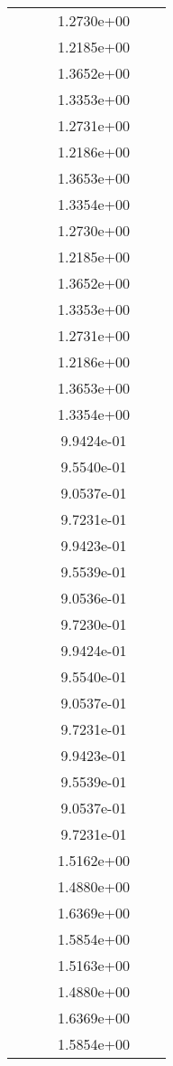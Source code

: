 \begin{xltabular}{\textwidth}{r|rS[table-format=1.3e+2]S[table-format=1.4e+2]S[table-format=1.4e+2]S[table-format=-1.5]}
&  &  & 1.2730e+00 & & \\
&  &  & 1.2185e+00 & & \\
&  &  & 1.3652e+00 & & \\
&  &  & 1.3353e+00 & & \\
&  &  & 1.2731e+00 & & \\
&  &  & 1.2186e+00 & & \\
&  &  & 1.3653e+00 & & \\
&  &  & 1.3354e+00 & & \\
&  &  & 1.2730e+00 & & \\
&  &  & 1.2185e+00 & & \\
&  &  & 1.3652e+00 & & \\
&  &  & 1.3353e+00 & & \\
&  &  & 1.2731e+00 & & \\
&  &  & 1.2186e+00 & & \\
&  &  & 1.3653e+00 & & \\
&  &  & 1.3354e+00 & & \\
&  &  & 9.9424e-01 & & \\
&  &  & 9.5540e-01 & & \\
&  &  & 9.0537e-01 & & \\
&  &  & 9.7231e-01 & & \\
&  &  & 9.9423e-01 & & \\
&  &  & 9.5539e-01 & & \\
&  &  & 9.0536e-01 & & \\
&  &  & 9.7230e-01 & & \\
&  &  & 9.9424e-01 & & \\
&  &  & 9.5540e-01 & & \\
&  &  & 9.0537e-01 & & \\
&  &  & 9.7231e-01 & & \\
&  &  & 9.9423e-01 & & \\
&  &  & 9.5539e-01 & & \\
&  &  & 9.0537e-01 & & \\
&  &  & 9.7231e-01 & & \\
&  &  & 1.5162e+00 & & \\
&  &  & 1.4880e+00 & & \\
&  &  & 1.6369e+00 & & \\
&  &  & 1.5854e+00 & & \\
&  &  & 1.5163e+00 & & \\
&  &  & 1.4880e+00 & & \\
&  &  & 1.6369e+00 & & \\
&  &  & 1.5854e+00 & & \\

\end{xltabular}
